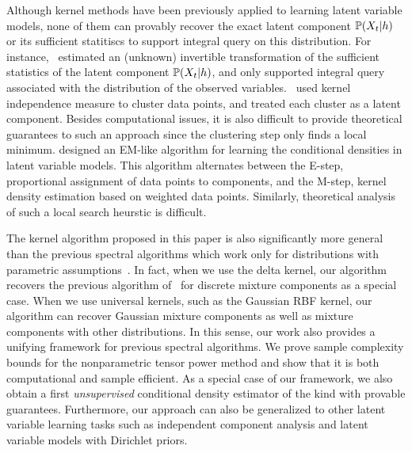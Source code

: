 \documentclass{article}
\begin{document}
Although kernel methods have been previously applied to learning latent variable models, none of them can provably recover the exact latent component $\mathbb{P}(X_t|h)$ or its sufficient statitiscs to support integral query on this distribution. For instance, \citet{SonParXin11, SonDai13}~estimated an (unknown) invertible transformation of the sufficient statistics of the latent component $\mathbb{P}(X_t|h)$, and only supported integral query associated with the distribution of the observed variables. \citet{SgoJanPetSch13}~used kernel independence measure to cluster data points, and treated each cluster as a latent component. Besides computational issues, it is also difficult to provide theoretical guarantees to such an approach since the clustering step only finds a local minimum. \citet{BenChaHun09} designed an EM-like algorithm for learning the conditional densities in latent variable models. This algorithm alternates between the E-step, proportional assignment of data points to components, and the M-step, kernel density estimation based on weighted data points. Similarly, theoretical analysis of such a local search heurstic is difficult.

The kernel algorithm proposed in this paper is also significantly more general than the previous spectral algorithms which work only for distributions with parametric assumptions~\cite{AnandkumarEtal:tensor12,HsuKak13}. In fact, when we use the delta kernel, our algorithm recovers the previous algorithm of~\citet{AnandkumarEtal:tensor12} for discrete mixture components as a special case. When we use universal kernels, such as the Gaussian RBF kernel, our algorithm can recover Gaussian mixture components as well as mixture components with other distributions. In this sense, our work also provides a unifying framework for previous spectral algorithms. We prove sample complexity bounds for the nonparametric tensor power method and show that it is both computational and sample efficient. As a special case of our framework, we also obtain a first \emph{unsupervised} conditional density estimator of the kind with provable guarantees. Furthermore, our approach can also be generalized to other latent variable learning tasks such as independent component analysis and latent variable models with Dirichlet priors.
\end{document}
